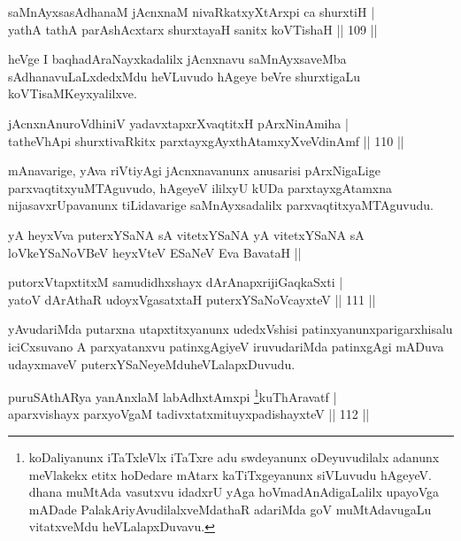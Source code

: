\begin{shl}
saMnAyxsasAdhanaM jAcnxnaM nivaRkatxyXtArxpi ca shurxtiH |\\
yathA tathA parAshAcxtarx shurxtayaH sanitx koVTishaH \hfill || 109 ||
\end{shl}

\begin{artha}%
heVge I baqhadAraNayxkadalilx jAcnxnavu saMnAyxsaveMba sAdhanavuLaLxdedxMdu heVLuvudo hAgeye beVre shurxtigaLu koVTi\break saMKeyxyalilxve.
\end{artha}

\begin{shl}
jAcnxnAnuroVdhiniV yadavxtapxrXvaqtitxH pArxNinAmiha |\\
tatheVhApi shurxtivaRkitx parxtayxgAyxthAtamxyXveVdinAmf \hfill || 110 ||
\end{shl}

\begin{artha}
mAnavarige, yAva riVtiyAgi jAcnxnavanunx anusarisi pArxNigaLige parxvaqtitxyuMTAguvudo, hAgeyeV ililxyU kUDa parxtayxgAtamxna nijasavxrUpavanunx tiLidavarige saMnAyxsadalilx parxvaqtitxyaMTAguvudu.
\end{artha}

\begin{shl}
yA heyxVva puterxYSaNA sA vitetxYSaNA yA vitetxYSaNA sA loVkeYSaNoVBeV heyxVteV ESaNeV Eva BavataH ||
\end{shl}


\begin{shl}
putorxVtapxtitxM samudidhxshayx dArAnapxrijiGaqkaSxti |\\
yatoV dArAthaR udoyxVgasatxtaH puterxYSaNoVcayxteV \hfill || 111 ||
\end{shl}

\begin{artha}
yAvudariMda putarxna utapxtitxyanunx udedxVshisi patinxyanunx\break parigarxhisalu iciCxsuvano A parxyatanxvu patinxgAgiyeV  iruvudariMda patinxgAgi mADuva udayxmaveV puterxYSaNeyeMdu\break heVLalapxDuvudu. 
\end{artha}

 
\begin{shl}
puruSAthARya yanAnxlaM labAdhxtAmx\s pi \footnote{koDaliyanunx iTaTxleVlx iTaTxre adu swdeyanunx oDeyuvudilalx adanunx meVlakekx etitx hoDedare mAtarx kaTiTxgeyanunx siVLuvudu hAgeyeV. dhana muMtAda vasutxvu idadxrU yAga hoVmadAnAdigaLalilx upayoVga mADade PalakAriyAvudilalx\-veMdathaR adariMda goV muMtAdavugaLu vitatxveMdu heVLalapxDuvavu.}kuThAravatf |\\
aparxvishayx parxyoVgaM tadivxtatxmituyxpadishayxteV \hfill || 112 ||
\end{shl}

